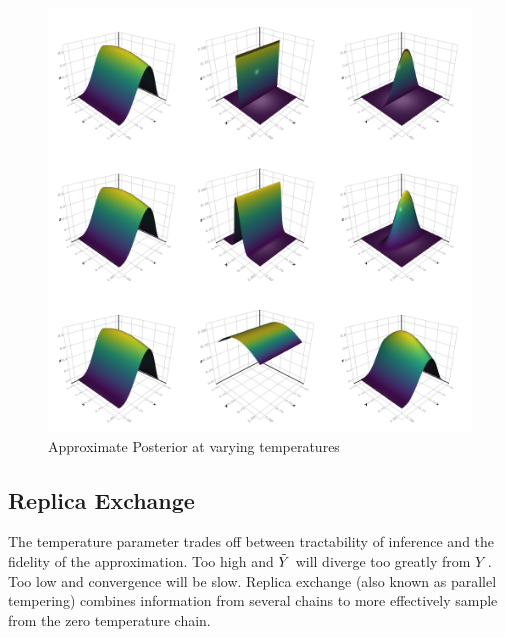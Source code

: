 \begin{figure}\label{temppost}
\includegraphics[width=\linewidth]{approxpost.png}
\caption{Approximate Posterior at varying temperatures}
\end{figure}



\subsection{Replica Exchange}\label{replicaexchange}

The temperature parameter trades off between tractability of inference and the fidelity of the approximation.
Too high and $\tilde{Y}$ will diverge too greatly from $Y$   . Too low and convergence will be slow.
Replica exchange (also known as parallel tempering) \citep{swendsen1986replica} combines information from several chains to more  effectively sample from the zero temperature chain.

